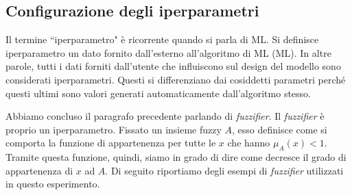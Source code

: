 \documentclass[12pt,italian]{report}
\begin{document}

\subsection{Configurazione degli iperparametri}

Il termine ``iperparametro" è ricorrente quando si parla di ML. Si definisce iperparametro un dato fornito dall'esterno all'algoritmo di ML (ML). In altre parole, tutti i dati forniti dall'utente che influiscono sul design del modello sono considerati iperparametri. Questi si differenziano dai cosiddetti parametri perché questi ultimi sono valori generati automaticamente dall'algoritmo stesso.

Abbiamo concluso il paragrafo precedente parlando di \emph{fuzzifier}. Il \emph{fuzzifier} è proprio un iperparametro. Fissato un insieme fuzzy $A$, esso definisce come si comporta la funzione di appartenenza per tutte le $x$ che hanno $ \mu_{A}(x) < 1 $. Tramite questa funzione, quindi, siamo in grado di dire come decresce il grado di appartenenza di $x$ ad $A$. Di seguito riportiamo degli esempi di \emph{fuzzifier} \cite{fuzzylearn} utilizzati in questo esperimento.
\end{document}
